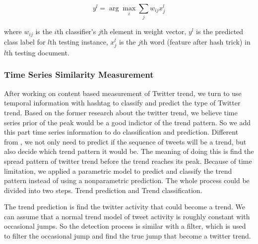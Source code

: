 \documentclass{article}
\begin{document}
\begin{equation} 
y^l =\arg\max_i  \sum_j w_{ij} x_j^l\label{eq:lrtest}
\end{equation}

where $w_{ij}$ is the $i$th classifier's $j$th element in weight vector, $y^l$ is the predicted class label for $l$th testing instance, $x_j^l$ is the $j$th word (feature after hash trick) in $l$th testing document. 

\subsubsection{Time Series Similarity Measurement}
After working on content based measurement of  Twitter trend, we turn to use temporal information with hashtag to classify and predict the type of Twitter trend. Based on the former research\cite{nikolov2012trend} about the twitter trend,
we believe time series prior of the peak would be a good indictor of the trend pattern. So we add this part time series information to do classification and prediction.
Different from \cite{nikolov2012trend}, we not only need to predict if the sequence of tweets will be a trend, but also decide which trend pattern it would be. The meaning of doing this is find the spread pattern of twitter trend before the trend reaches its peak.  Because of time limitation, we applied a parametric model to predict and classify the trend pattern instead of using a nonparametric prediction. The whole process could be divided into two steps. Trend prediction and Trend classification.

The trend prediction is find the twitter activity that could become a trend. We can assume that a normal trend model of tweet activity is roughly constant with occasional jumps. So the detection process is similar with a filter, which is used to filter the occasional jump and find the true jump that become a twitter trend.
\end{document}
